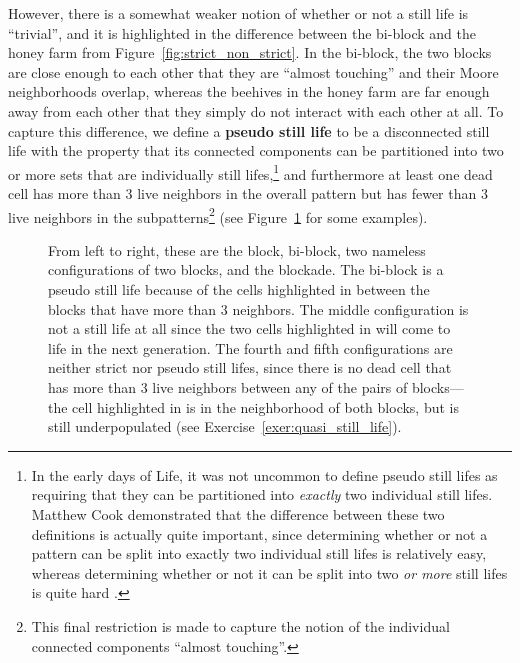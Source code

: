 However, there is a somewhat weaker notion of whether or not a still life is ``trivial'', and it is highlighted in the difference between the bi-block and the honey farm from Figure~\ref{fig:strict_non_strict}. In the bi-block, the two blocks are close enough to each other that they are ``almost touching'' and their Moore neighborhoods overlap, whereas the beehives in the honey farm are far enough away from each other that they simply do not interact with each other at all. To capture this difference, we define a \textbf{pseudo still life} to be a disconnected still life with the property that its connected components can be partitioned into two or more sets that are individually still lifes,\footnote{In the early days of Life, it was not uncommon to define pseudo still lifes as requiring that they can be partitioned into \emph{exactly} two individual still lifes. Matthew Cook demonstrated that the difference between these two definitions is actually quite important, since determining whether or not a pattern can be split into exactly two individual still lifes is relatively easy, whereas determining whether or not it can be split into two \emph{or more} still lifes is quite hard \cite{Coo03}.} and furthermore at least one dead cell has more than $3$ live neighbors in the overall pattern but has fewer than $3$ live neighbors in the subpatterns\footnote{This final restriction is made to capture the notion of the individual connected components ``almost touching''.} (see Figure~\ref{fig:pseudo_not_pseudo} for some examples).

\begin{figure}[!htb]
	\centering{}
	\caption{From left to right, these are the block, bi-block, two nameless configurations of two blocks, and the blockade. The bi-block is a pseudo still life because of the cells highlighted in  between the blocks that have more than $3$ neighbors. The middle configuration is not a still life at all since the two cells highlighted in  will come to life in the next generation. The fourth and fifth configurations are neither strict nor pseudo still lifes, since there is no dead cell that has more than $3$ live neighbors between any of the pairs of blocks---the cell highlighted in  is in the neighborhood of both blocks, but is still underpopulated (see Exercise~\ref{exer:quasi_still_life}).}\label{fig:pseudo_not_pseudo}
\end{figure}

